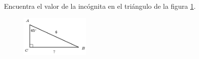\question[15]  Encuentra el valor de la incógnita en el triángulo de la figura \ref{fig:lados_functrig_04}.
\begin{figure}[H]
    \begin{center}
        \includegraphics[width=0.3\textwidth]{../images/lados_functrig_04.png}
    \end{center}
    \caption{}
    \label{fig:lados_functrig_04}
\end{figure}
